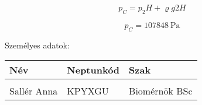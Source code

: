 \begin{equation}
p_C = p_2H + \varrho g 2H
\end{equation}

\begin{equation}
p_C = \SI{107848}{\pascal}
\end{equation}


\newcommand{\aline}{\\\hline &&\rule{0cm}{1cm}}
	
	Személyes adatok:
	\medskip
	
	\begin{tabular}{|p{3cm}|p{3cm}|p{3cm}|}
		\hline
		Név & Neptunkód & Szak
		\forloop{\aline}\\
		Sallér Anna & KPYXGU & Biomérnök BSc
		\forloop\\
		\hline
		
	\end{tabular}
	\medskip
	
